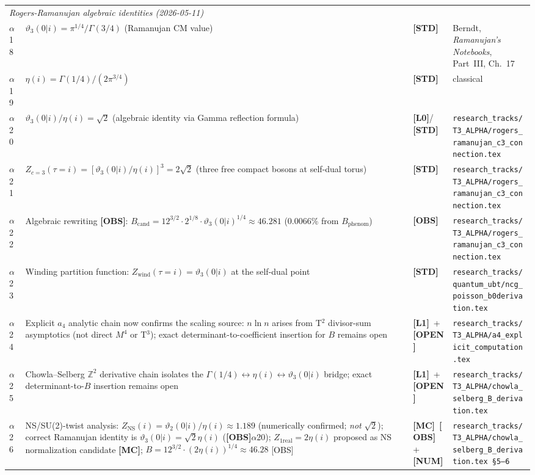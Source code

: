 \documentclass[12pt,a4paper]{article}
\theoremstyle{definition}
\theoremstyle{remark}
\newcommand{\Lzero}{\textbf{[L0]}}
\newcommand{\Lone}{\textbf{[L1]}}
\newcommand{\NUM}{\textbf{[NUM]}}
\newcommand{\STD}{\textbf{[STD]}}
\newcommand{\MC}{\textbf{[MC]}}
\newcommand{\OBS}{\textbf{[OBS]}}
\newcommand{\OPEN}{\textbf{[OPEN]}}
\begin{document}
\begin{longtable}{p{0.8cm} p{6.8cm} p{1.6cm} p{4.5cm}}
\multicolumn{4}{l}{\textit{Rogers-Ramanujan algebraic identities (2026-05-11)}} \\[2pt]
$\alpha$18 & $\vartheta_3(0|i) = \pi^{1/4}/\Gamma(3/4)$ (Ramanujan CM value) & \STD &
  Berndt, \textit{Ramanujan's Notebooks}, Part~III, Ch.~17 \\[4pt]
$\alpha$19 & $\eta(i) = \Gamma(1/4)/(2\pi^{3/4})$ & \STD & classical \\[4pt]
$\alpha$20 & $\vartheta_3(0|i)/\eta(i) = \sqrt{2}$ (algebraic identity via
  Gamma reflection formula) & \Lzero / \STD &
  \texttt{research\_tracks/T3\_ALPHA/rogers\_ramanujan\_c3\_connection.tex} \\[4pt]
$\alpha$21 & $Z_{c=3}(\tau=i) = [\vartheta_3(0|i)/\eta(i)]^3 = 2\sqrt{2}$
  (three free compact bosons at self-dual torus) & \STD &
  \texttt{research\_tracks/T3\_ALPHA/rogers\_ramanujan\_c3\_connection.tex} \\[4pt]
$\alpha$22 & Algebraic rewriting \OBS:
  $B_{\mathrm{cand}} = 12^{3/2}\cdot 2^{1/8}\cdot\vartheta_3(0|i)^{1/4}
  \approx 46.281$ (0.0066\% from $B_{\mathrm{phenom}}$) & \OBS &
  \texttt{research\_tracks/T3\_ALPHA/rogers\_ramanujan\_c3\_connection.tex} \\[4pt]
$\alpha$23 & Winding partition function:
  $Z_{\mathrm{wind}}(\tau=i) = \vartheta_3(0|i)$
  at the self-dual point & \STD &
  \texttt{research\_tracks/quantum\_ubt/ncg\_poisson\_b0derivation.tex} \\[4pt]
$\alpha$24 & Explicit $a_4$ analytic chain now confirms the scaling source:
  $n\ln n$ arises from T$^2$ divisor-sum asymptotics (not direct $M^4$ or T$^3$);
  exact determinant-to-coefficient insertion for $B$ remains open & \Lone\ + \OPEN &
  \texttt{research\_tracks/T3\_ALPHA/a4\_explicit\_computation.tex} \\[4pt]
$\alpha$25 & Chowla--Selberg $\mathbb{Z}^2$ derivative chain isolates
  the $\Gamma(1/4)\leftrightarrow\eta(i)\leftrightarrow\vartheta_3(0|i)$ bridge;
  exact determinant-to-$B$ insertion remains open & \Lone\ + \OPEN &
  \texttt{research\_tracks/T3\_ALPHA/chowla\_selberg\_B\_derivation.tex} \\[4pt]
$\alpha$26 & NS/SU(2)-twist analysis: $Z_{\mathrm{NS}}(i)=\vartheta_2(0|i)/\eta(i)\approx1.189$
  (numerically confirmed; \emph{not} $\sqrt{2}$); correct Ramanujan identity is
  $\vartheta_3(0|i)=\sqrt{2}\eta(i)$ (\OBS $\alpha$20);
  $Z_{1\mathrm{real}}=2\eta(i)$ proposed as NS normalization candidate \MC;
  $B = 12^{3/2}\cdot(2\eta(i))^{1/4}\approx46.28$ [OBS] & \MC\ \OBS\ + \NUM &
  \texttt{research\_tracks/T3\_ALPHA/chowla\_selberg\_B\_derivation.tex \S5--6} \\[4pt]

\end{longtable}
\end{document}
